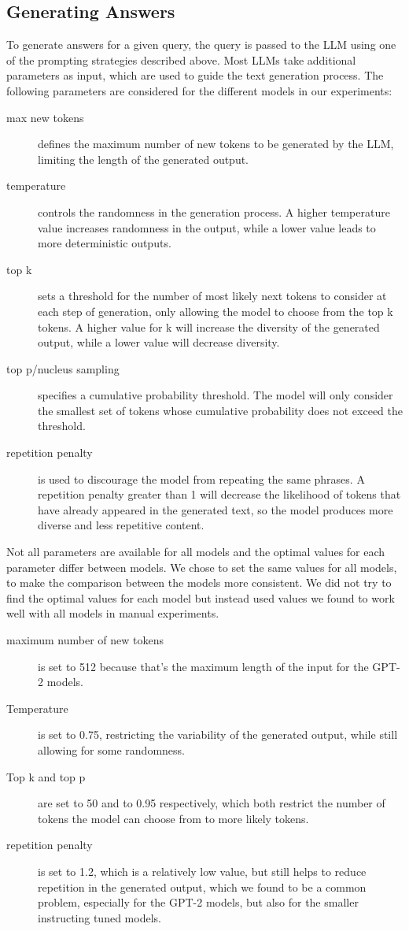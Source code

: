 \subsection{Generating Answers}
To generate answers for a given query, the query is passed to the LLM using one of the prompting strategies described above.
Most LLMs take additional parameters as input, which are used to guide the text generation process.
The following parameters are considered for the different models in our experiments:
\begin{description}
    \item [max new tokens] defines the maximum number of new tokens to be generated by the LLM, limiting the length of the generated output.
    \item [temperature] controls the randomness in the generation process. A higher temperature value increases randomness in the output, while a lower value leads to more deterministic outputs.
    \item [top k] sets a threshold for the number of most likely next tokens to consider at each step of generation, only allowing the model to choose from the top k tokens. A higher value for k will increase the diversity of the generated output, while a lower value will decrease diversity.
    \item [top p/nucleus sampling] specifies a cumulative probability threshold. The model will only consider the smallest set of tokens whose cumulative probability does not exceed the threshold.
    \item [repetition penalty] is used to discourage the model from repeating the same phrases. A repetition penalty greater than 1 will decrease the likelihood of tokens that have already appeared in the generated text, so the model produces more diverse and less repetitive content.
\end{description}
Not all parameters are available for all models and the optimal values for each parameter differ between models.
We chose to set the same values for all models, to make the comparison between the models more consistent.
We did not try to find the optimal values for each model but instead used values we found to work well with all models in manual experiments.
\begin{description}
\item[maximum number of new tokens] is set to 512 because that's the maximum length of the input for the GPT-2 models.

\item[Temperature] is set to 0.75, restricting the variability of the generated output, while still allowing for some randomness.

\item[Top k and top p] are set to 50 and to 0.95 respectively, which both restrict the number of tokens the model can choose from to more likely tokens.

\item[repetition penalty] is set to 1.2, which is a relatively low value, but still helps to reduce repetition in the generated output, which we found to be a common problem, especially for the GPT-2 models, but also for the smaller instructing tuned models.
\end{description}
